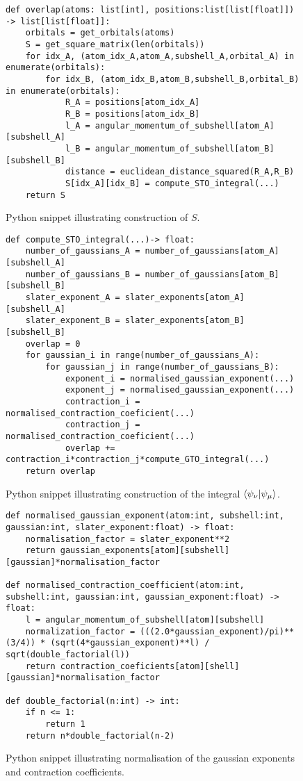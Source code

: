 \begin{figure}[H]
\begin{verbatim}
def overlap(atoms: list[int], positions:list[list[float]]) -> list[list[float]]:
    orbitals = get_orbitals(atoms)
    S = get_square_matrix(len(orbitals))
    for idx_A, (atom_idx_A,atom_A,subshell_A,orbital_A) in enumerate(orbitals):
        for idx_B, (atom_idx_B,atom_B,subshell_B,orbital_B) in enumerate(orbitals):
            R_A = positions[atom_idx_A]
            R_B = positions[atom_idx_B]
            l_A = angular_momentum_of_subshell[atom_A][subshell_A]
            l_B = angular_momentum_of_subshell[atom_B][subshell_B]
            distance = euclidean_distance_squared(R_A,R_B)
            S[idx_A][idx_B] = compute_STO_integral(...)
    return S
\end{verbatim}
\caption{Python snippet illustrating construction of $S$.}
\end{figure}
\begin{figure}[H]
\begin{verbatim}
def compute_STO_integral(...)-> float:
    number_of_gaussians_A = number_of_gaussians[atom_A][subshell_A]
    number_of_gaussians_B = number_of_gaussians[atom_B][subshell_B]
    slater_exponent_A = slater_exponents[atom_A][subshell_A]
    slater_exponent_B = slater_exponents[atom_B][subshell_B]
    overlap = 0
    for gaussian_i in range(number_of_gaussians_A):
        for gaussian_j in range(number_of_gaussians_B):
            exponent_i = normalised_gaussian_exponent(...)
            exponent_j = normalised_gaussian_exponent(...)
            contraction_i = normalised_contraction_coeficient(...)
            contraction_j = normalised_contraction_coeficient(...)
            overlap += contraction_i*contraction_j*compute_GTO_integral(...)
    return overlap
\end{verbatim}
    \caption{Python snippet illustrating construction of the integral $\braket{\psi_\nu|\psi_\mu}$.}
\end{figure}
\begin{figure}[H]
\begin{verbatim}
def normalised_gaussian_exponent(atom:int, subshell:int, gaussian:int, slater_exponent:float) -> float:
    normalisation_factor = slater_exponent**2
    return gaussian_exponents[atom][subshell][gaussian]*normalisation_factor

def normalised_contraction_coefficient(atom:int, subshell:int, gaussian:int, gaussian_exponent:float) -> float:
    l = angular_momentum_of_subshell[atom][subshell]
    normalization_factor = (((2.0*gaussian_exponent)/pi)**(3/4)) * (sqrt(4*gaussian_exponent)**l) / sqrt(double_factorial(l))
    return contraction_coeficients[atom][shell][gaussian]*normalisation_factor

def double_factorial(n:int) -> int:
    if n <= 1:
        return 1
    return n*double_factorial(n-2)
\end{verbatim}
    \caption{Python snippet illustrating normalisation of the gaussian exponents and contraction coefficients.}
\end{figure}

